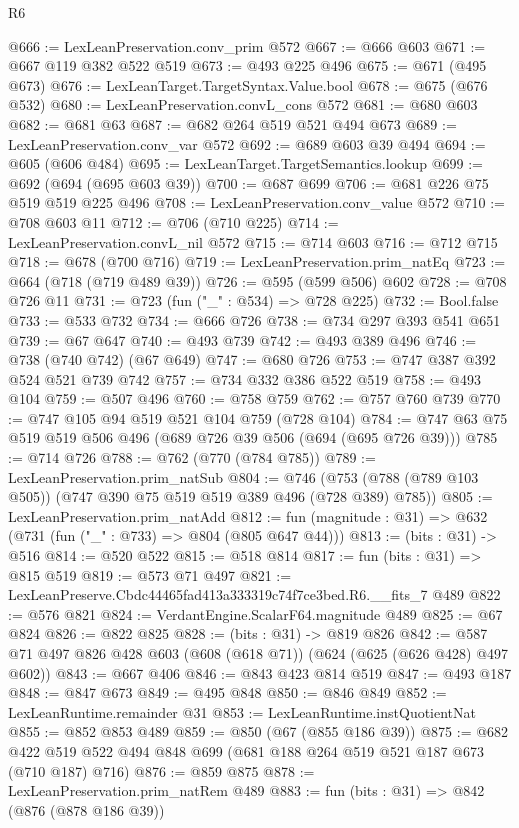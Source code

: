 \begin{lexlean}{R6}
\begin{coremodule}
@666 := LexLeanPreservation.conv_prim @572
@667 := @666 @603
@671 := @667 @119 @382 @522 @519
@673 := @493 @225 @496
@675 := @671 (@495 @673)
@676 := LexLeanTarget.TargetSyntax.Value.bool
@678 := @675 (@676 @532)
@680 := LexLeanPreservation.convL_cons @572
@681 := @680 @603
@682 := @681 @63
@687 := @682 @264 @519 @521 @494 @673
@689 := LexLeanPreservation.conv_var @572
@692 := @689 @603 @39 @494
@694 := @605 (@606 @484)
@695 := LexLeanTarget.TargetSemantics.lookup
@699 := @692 (@694 (@695 @603 @39))
@700 := @687 @699
@706 := @681 @226 @75 @519 @519 @225 @496
@708 := LexLeanPreservation.conv_value @572
@710 := @708 @603 @11
@712 := @706 (@710 @225)
@714 := LexLeanPreservation.convL_nil @572
@715 := @714 @603
@716 := @712 @715
@718 := @678 (@700 @716)
@719 := LexLeanPreservation.prim_natEq
@723 := @664 (@718 (@719 @489 @39))
@726 := @595 (@599 @506) @602
@728 := @708 @726 @11
@731 := @723 (fun ("_" : @534) => @728 @225)
@732 := Bool.false
@733 := @533 @732
@734 := @666 @726
@738 := @734 @297 @393 @541 @651
@739 := @67 @647
@740 := @493 @739
@742 := @493 @389 @496
@746 := @738 (@740 @742) (@67 @649)
@747 := @680 @726
@753 := @747 @387 @392 @524 @521 @739 @742
@757 := @734 @332 @386 @522 @519
@758 := @493 @104
@759 := @507 @496
@760 := @758 @759
@762 := @757 @760 @739
@770 := @747 @105 @94 @519 @521 @104 @759 (@728 @104)
@784 := @747 @63 @75 @519 @519 @506 @496 (@689 @726 @39 @506 (@694 (@695 @726 @39)))
@785 := @714 @726
@788 := @762 (@770 (@784 @785))
@789 := LexLeanPreservation.prim_natSub
@804 := @746 (@753 (@788 (@789 @103 @505)) (@747 @390 @75 @519 @519 @389 @496 (@728 @389) @785))
@805 := LexLeanPreservation.prim_natAdd
@812 := fun (magnitude : @31) => @632 (@731 (fun ("_" : @733) => @804 (@805 @647 @44)))
@813 := (bits : @31) -> @516
@814 := @520 @522
@815 := @518 @814
@817 := fun (bits : @31) => @815 @519
@819 := @573 @71 @497
@821 := LexLeanPreserve.Cbdc44465fad413a333319c74f7ce3bed.R6.__fits_7 @489
@822 := @576 @821
@824 := VerdantEngine.ScalarF64.magnitude @489
@825 := @67 @824
@826 := @822 @825
@828 := (bits : @31) -> @819 @826
@842 := @587 @71 @497 @826 @428 @603 (@608 (@618 @71)) (@624 (@625 (@626 @428) @497 @602))
@843 := @667 @406
@846 := @843 @423 @814 @519
@847 := @493 @187
@848 := @847 @673
@849 := @495 @848
@850 := @846 @849
@852 := LexLeanRuntime.remainder @31
@853 := LexLeanRuntime.instQuotientNat
@855 := @852 @853 @489
@859 := @850 (@67 (@855 @186 @39))
@875 := @682 @422 @519 @522 @494 @848 @699 (@681 @188 @264 @519 @521 @187 @673 (@710 @187) @716)
@876 := @859 @875
@878 := LexLeanPreservation.prim_natRem @489
@883 := fun (bits : @31) => @842 (@876 (@878 @186 @39))

\end{coremodule}
\end{lexlean}

